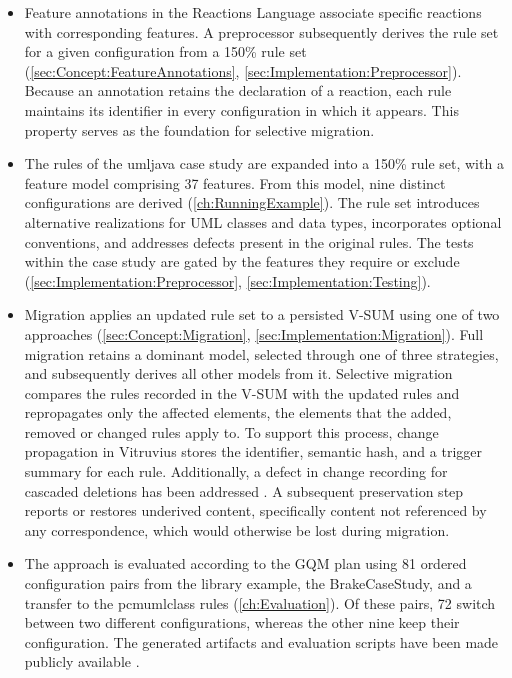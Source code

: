 \begin{itemize}
      \item Feature annotations in the Reactions Language associate specific reactions with corresponding features.
            A preprocessor subsequently derives the rule set for a given configuration from a 150\% rule set (\autoref{sec:Concept:FeatureAnnotations}, \autoref{sec:Implementation:Preprocessor}).
            Because an annotation retains the declaration of a reaction, each rule maintains its identifier in every configuration in which it appears.
            This property serves as the foundation for selective migration.
      \item The rules of the umljava case study are expanded into a 150\% rule set, with a feature model comprising 37 features.
            From this model, nine distinct configurations are derived (\autoref{ch:RunningExample}).
            The rule set introduces alternative realizations for UML classes and data types, incorporates optional conventions, and addresses defects present in the original rules.
            The tests within the case study are gated by the features they require or exclude (\autoref{sec:Implementation:Preprocessor}, \autoref{sec:Implementation:Testing}).
      \item Migration applies an updated rule set to a persisted V-SUM using one of two approaches (\autoref{sec:Concept:Migration}, \autoref{sec:Implementation:Migration}).
            Full migration retains a dominant model, selected through one of three strategies, and subsequently derives all other models from it.
            Selective migration compares the rules recorded in the V-SUM with the updated rules and repropagates only the affected elements, the elements that the added, removed or changed rules apply to.
            To support this process, change propagation in Vitruvius stores the identifier, semantic hash, and a trigger summary for each rule.
            Additionally, a defect in change recording for cascaded deletions has been addressed \cite{vitruv-change-issue}.
            A subsequent preservation step reports or restores underived content, specifically content not referenced by any correspondence, which would otherwise be lost during migration.
      \item The approach is evaluated according to the GQM plan using 81 ordered configuration pairs from the library example, the BrakeCaseStudy, and a transfer to the pcmumlclass rules (\autoref{ch:Evaluation}).
            Of these pairs, 72 switch between two different configurations, whereas the other nine keep their configuration.
            The generated artifacts and evaluation scripts have been made publicly available \cite{thesis-repo}.
\end{itemize}


